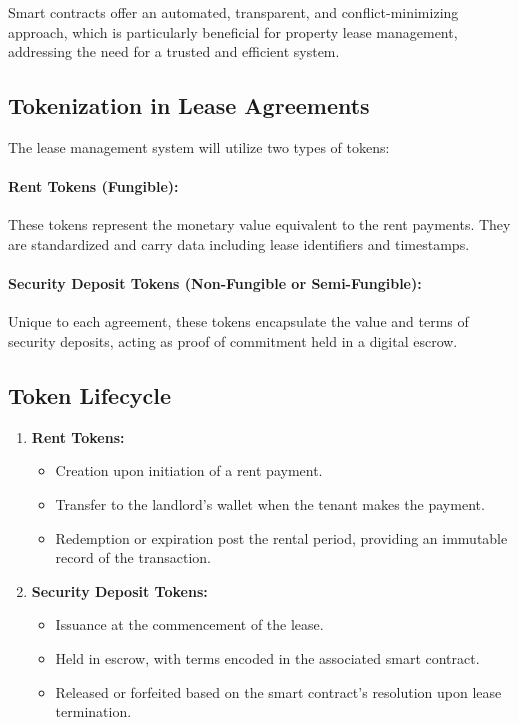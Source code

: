 \documentclass{article}
\begin{document}
Smart contracts offer an automated, transparent, and conflict-minimizing approach, which is particularly beneficial for property lease management, addressing the need for a trusted and efficient system.

\subsection{Tokenization in Lease Agreements}
The lease management system will utilize two types of tokens:

\paragraph{Rent Tokens (Fungible):} These tokens represent the monetary value equivalent to the rent payments. They are standardized and carry data including lease identifiers and timestamps.

\paragraph{Security Deposit Tokens (Non-Fungible or Semi-Fungible):} Unique to each agreement, these tokens encapsulate the value and terms of security deposits, acting as proof of commitment held in a digital escrow.

\subsection{Token Lifecycle}
\begin{enumerate}
  \item \textbf{Rent Tokens:}
  \begin{itemize}
    \item Creation upon initiation of a rent payment.
    \item Transfer to the landlord's wallet when the tenant makes the payment.
    \item Redemption or expiration post the rental period, providing an immutable record of the transaction.
  \end{itemize}
  \item \textbf{Security Deposit Tokens:}
  \begin{itemize}
    \item Issuance at the commencement of the lease.
    \item Held in escrow, with terms encoded in the associated smart contract.
    \item Released or forfeited based on the smart contract's resolution upon lease termination.
  \end{itemize}
\end{enumerate}
\end{document}
